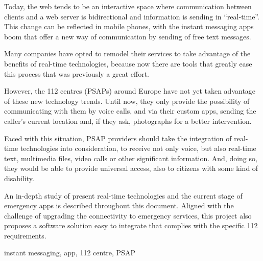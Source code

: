 \begin{abstractEn}
	Today, the web tends to be an interactive space where communication between clients and  a web server is bidirectional and information is sending in “real-time”. This change can be reflected in mobile phones, with the instant messaging apps boom that offer a new way of communication by sending of free text messages.

	Many companies have opted to remodel their services to take advantage of the benefits of real-time technologies, because now there are tools that greatly ease this process that was previously a great effort.

	However, the 112 centres (PSAPs) around Europe have not yet taken advantage of these new technology trends. Until now, they only provide the possibility of communicating with them by voice calls, and via their custom apps, sending the caller’s current location and, if they ask, photographs for a better intervention.

	Faced with this situation, PSAP providers should take the integration of real-time technologies into consideration, to receive not only voice, but also real-time text, multimedia files, video calls or other significant information. And, doing so, they would be able to provide universal access, also to citizens with some kind of disability.

	An in-depth study of present real-time technologies and the current stage of emergency apps is described throughout this document. Aligned with the challenge of upgrading the connectivity to emergency services, this project also proposes a software solution easy to integrate that complies with the specific 112 requirements.
\end{abstractEn}

\begin{keywordsEn}
	instant messaging, app, 112 centre, PSAP
\end{keywordsEn}
